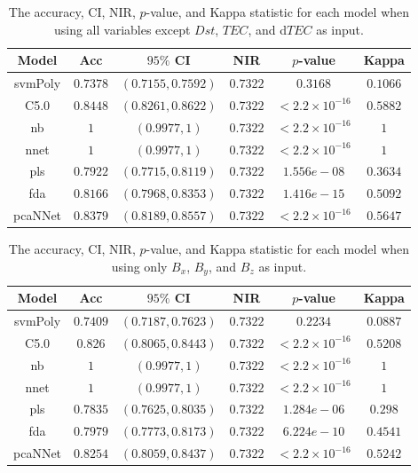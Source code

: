 \documentclass[sn-mathphys-num]{sn-jnl}%
\begin{document}
\begin{table}[!ht]
    \centering
    \caption{The accuracy, CI, NIR, $p$-value, and Kappa statistic for each model when using all variables except $Dst$, $TEC$, and d$TEC$ as input.}
	\label{tab:stats:reverse:no$TEC$}
	\begin{tabular}{|c|c|c|c|c|c|}
		\hline
		Model & Acc & $95\%$ CI & NIR & $p$-value & Kappa \\ \hline
		svmPoly & $0.7378$ & $(0.7155, 0.7592)$ & $0.7322$ & $0.3168$ & $0.1066$ \\ \hline
		C5.0 & $0.8448$ & $(0.8261, 0.8622)$ & $0.7322$ & $< 2.2 \times {10}^{-16}$ & $0.5882$ \\ \hline
		nb & $1$ & $(0.9977, 1)$ & $0.7322$ & $< 2.2 \times {10}^{-16}$ & $1$ \\ \hline
		nnet & $1$ & $(0.9977, 1)$ & $0.7322$ & $< 2.2 \times {10}^{-16}$ & $1$ \\ \hline
		pls & $0.7922$ & $(0.7715, 0.8119)$ & $0.7322$ & $1.556e-08$ & $0.3634$ \\ \hline
		fda & $0.8166$ & $(0.7968, 0.8353)$ & $0.7322$ & $1.416e-15$ & $0.5092$ \\ \hline
		pcaNNet & $0.8379$ & $(0.8189, 0.8557)$ & $0.7322$ & $< 2.2 \times {10}^{-16}$ & $0.5647$ \\ \hline
	\end{tabular}
\end{table}

\begin{table}[!ht]
    \centering
    \caption{The accuracy, CI, NIR, $p$-value, and Kappa statistic for each model when using only $B_{x}$, $B_{y}$, and $B_{z}$ as input.}
	\label{tab:stats:reverse:coord}
	\begin{tabular}{|c|c|c|c|c|c|}
		\hline
		Model & Acc & $95\%$ CI & NIR & $p$-value & Kappa \\ \hline
		svmPoly & $0.7409$ & $(0.7187, 0.7623)$ & $0.7322$ & $0.2234$ & $0.0887$ \\ \hline
		C5.0 & $0.826$ & $(0.8065, 0.8443)$ & $0.7322$ & $< 2.2 \times {10}^{-16}$ & $0.5208$ \\ \hline
		nb & $1$ & $(0.9977, 1)$ & $0.7322$ & $< 2.2 \times {10}^{-16}$ & $1$ \\ \hline
		nnet & $1$ & $(0.9977, 1)$ & $0.7322$ & $< 2.2 \times {10}^{-16}$ & $1$ \\ \hline
		pls & $0.7835$ & $(0.7625, 0.8035)$ & $0.7322$ & $1.284e-06$ & $0.298$ \\ \hline
		fda & $0.7979$ & $(0.7773, 0.8173)$ & $0.7322$ & $6.224e-10$ & $0.4541$ \\ \hline
		pcaNNet & $0.8254$ & $(0.8059, 0.8437)$ & $0.7322$ & $< 2.2 \times {10}^{-16}$ & $0.5242$ \\ \hline
	\end{tabular}
\end{table}
\end{document}
